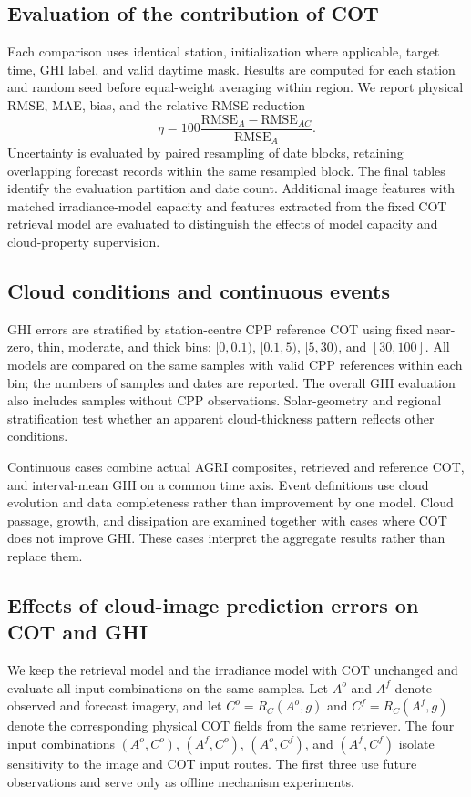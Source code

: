 \documentclass[11pt]{article}
\begin{document}
\subsection{Evaluation of the contribution of COT}
Each comparison uses identical station, initialization where applicable, target time, GHI label, and valid daytime mask. Results are computed for each station and random seed before equal-weight averaging within region. We report physical RMSE, MAE, bias, and the relative RMSE reduction
\begin{equation}
\eta=100\frac{\mathrm{RMSE}_{A}-\mathrm{RMSE}_{AC}}{\mathrm{RMSE}_{A}}.
\label{eq:gain}
\end{equation}
Uncertainty is evaluated by paired resampling of date blocks, retaining overlapping forecast records within the same resampled block. The final tables identify the evaluation partition and date count. Additional image features with matched irradiance-model capacity and features extracted from the fixed COT retrieval model are evaluated to distinguish the effects of model capacity and cloud-property supervision.

\FloatBarrier
\subsection{Cloud conditions and continuous events}
GHI errors are stratified by station-centre CPP reference COT using fixed near-zero, thin, moderate, and thick bins: $[0,0.1)$, $[0.1,5)$, $[5,30)$, and $[30,100]$. All models are compared on the same samples with valid CPP references within each bin; the numbers of samples and dates are reported. The overall GHI evaluation also includes samples without CPP observations. Solar-geometry and regional stratification test whether an apparent cloud-thickness pattern reflects other conditions.

Continuous cases combine actual AGRI composites, retrieved and reference COT, and interval-mean GHI on a common time axis. Event definitions use cloud evolution and data completeness rather than improvement by one model. Cloud passage, growth, and dissipation are examined together with cases where COT does not improve GHI. These cases interpret the aggregate results rather than replace them.

\FloatBarrier
\subsection{Effects of cloud-image prediction errors on COT and GHI}
We keep the retrieval model and the irradiance model with COT unchanged and evaluate all input combinations on the same samples. Let $A^o$ and $A^f$ denote observed and forecast imagery, and let $C^o=R_C(A^o,g)$ and $C^f=R_C(A^f,g)$ denote the corresponding physical COT fields from the same retriever. The four input combinations $(A^o,C^o)$, $(A^f,C^o)$, $(A^o,C^f)$, and $(A^f,C^f)$ isolate sensitivity to the image and COT input routes. The first three use future observations and serve only as offline mechanism experiments.
\end{document}
